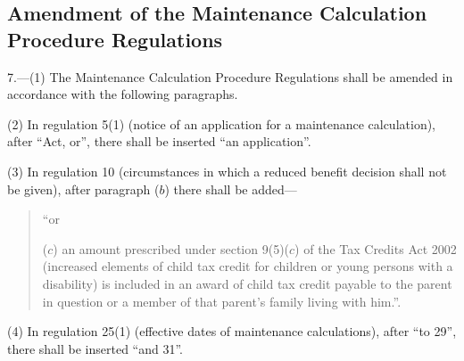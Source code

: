 \documentclass[12pt,a4paper]{article}
\begin{document}
\subsection[7. Amendment of the Maintenance Calculation Procedure Regulations]{Amendment of the Maintenance Calculation Procedure Regulations}

7.---(1)  The Maintenance Calculation Procedure Regulations shall be amended in accordance with the following paragraphs.

(2) In regulation 5(1) (notice of an application for a maintenance calculation), after “Act, or”, there shall be inserted “an application”.

(3) In regulation 10 (circumstances in which a reduced benefit decision shall not be given), after paragraph ($b$)  there shall be added—
\begin{quotation}
    “or

    ($c$) 
    an amount prescribed under section 9(5)($c$)  of the Tax Credits Act 2002 (increased elements of child tax credit for children or young persons with a disability) is included in an award of child tax credit payable to the parent in question or a member of that parent’s family living with him.”. 
\end{quotation}

(4) In regulation 25(1) (effective dates of maintenance calculations), after “to 29”, there shall be inserted “and 31”.
\end{document}
